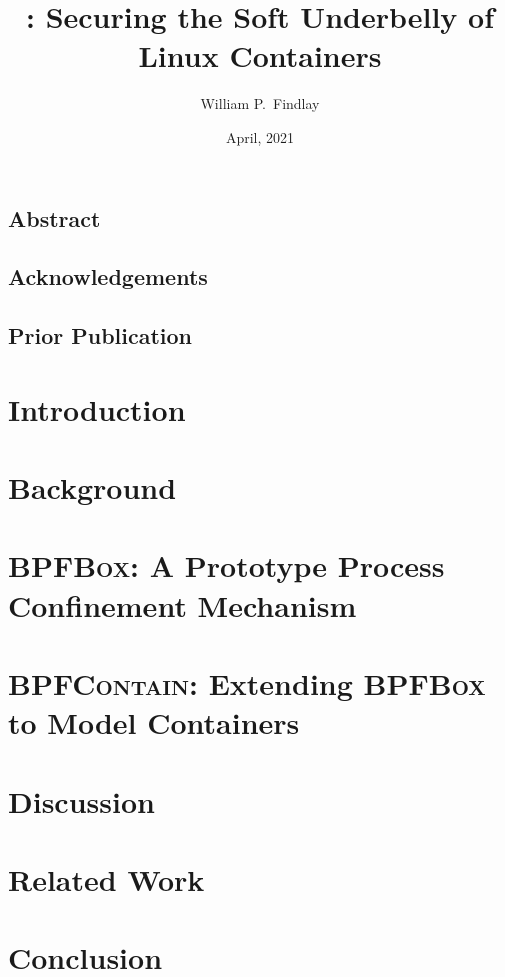 \documentclass[
  fontsize=12pt,
  paper=letter,
  twoside,
  cleardoublepage=plain,
]{scrbook}
\title{\bpfcontain\@: Securing the Soft Underbelly of Linux Containers}
\author{William P.~Findlay}
\date{April, 2021}
\newcommand{\bpfbox}{\textsc{BPFBox}}
\newcommand{\bpfcontain}{\textsc{BPFContain}}
\begin{document}



\frontmatter%

\section*{Abstract}
\cleardoublepage%

\section*{Acknowledgements}
\cleardoublepage%

\section*{Prior Publication}
\cleardoublepage%

\begingroup
\hypersetup{linkcolor=black}
\tableofcontents
\listoffigures
\listoftables
\endgroup

\mainmatter%


\chapter{Introduction}%
\label{c:introduction}


\chapter{Background}%
\label{c:background}


\chapter{\bpfbox: A Prototype Process Confinement Mechanism}%
\label{c:bpfbox}


\chapter{\bpfcontain: Extending \bpfbox{} to Model Containers}%
\label{c:bpfcontain}


\chapter{Discussion}%
\label{c:discussion}


\chapter{Related Work}%
\label{c:related}


\chapter{Conclusion}%
\label{c:conclusion}

\end{document}
